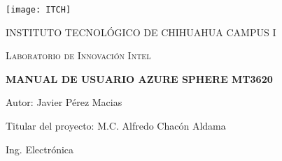 \begin{titlepage}
	\centering
	\texttt{[image: ITCH]}\par\vspace{1cm}
	{\textsc{INSTITUTO TECNOLÓGICO DE CHIHUAHUA CAMPUS I} \par}
	\vspace{0.5cm}
	{\textsc{Laboratorio de Innovación Intel} \par}
	\vspace{1cm}
	\vspace{1.5cm}
	{\huge\bfseries MANUAL DE USUARIO AZURE SPHERE MT3620 \par}
	\vspace{2cm}
	{\Large Autor: Javier Pérez Macias\par}

	\vspace{2cm}
	{\Large Titular del proyecto: M.C. Alfredo Chacón Aldama\par}
	{\Large Ing. Electrónica\par}
	\vfill
\end{titlepage}
